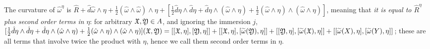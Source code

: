 The curvature of $\hat \omega^\eta$ is $\hat R + \hat d \hat \omega \wedge \eta + \frac{1}{2} (\hat \omega \wedge \hat \omega) \wedge \eta + [\frac{1}{2} \hat d \eta \wedge \hat d \eta + \hat d \eta \wedge (\hat \omega \wedge \eta) + \frac{1}{2} (\hat \omega \wedge \eta) \wedge (\hat \omega \wedge \eta)]$, meaning that \emph{it is equal to $\hat R^\eta$ plus second order terms in $\eta$}: for arbitrary $\mathfrak{X}, \mathfrak{Y} \in A$, and ignoring the immersion $j$, $[\frac{1}{2} \hat d \eta \wedge \hat d \eta + \hat d \eta \wedge (\hat \omega \wedge \eta) + \frac{1}{2} (\hat \omega \wedge \eta) \wedge (\hat \omega \wedge \eta)](\mathfrak{X}, \mathfrak{Y}) = [[\mathfrak{X}, \eta], [\mathfrak{Y}, \eta]] + [[\mathfrak{X}, \eta], [\widetilde \omega(\mathfrak{Y}), \eta]] + [[\mathfrak{Y}, \eta], [\widetilde \omega(\mathfrak{X}), \eta]] + [[\widetilde \omega(X), \eta], [\widetilde \omega(Y), \eta]]$; these are all terms that involve twice the product with $\eta$, hence we call them second order terms in $\eta$.

